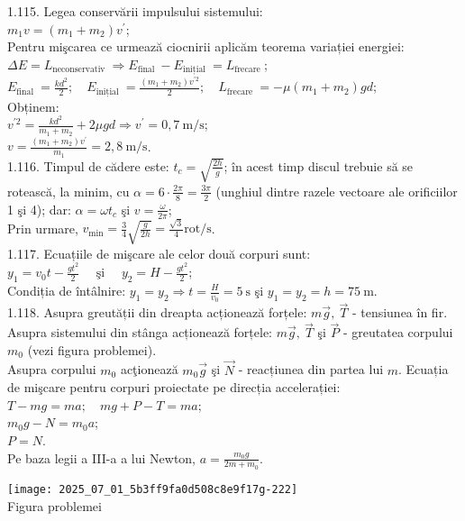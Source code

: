 1.115. Legea conservării impulsului sistemului:\\ $m_{1} v=\left(m_{1}+m_{2}\right) v^{\prime}$;\\ Pentru mişcarea ce urmează ciocnirii aplicăm teorema variației energiei:\\ $\Delta E=L_{\text {neconservativ }} \Rightarrow E_{\text {final }}-E_{\text {inițial }}=L_{\text {frecare }}$;\\ $E_{\text {final }}=\frac{k d^{2}}{2}; \quad E_{\text {inițial }}=\frac{\left(m_{1}+m_{2}\right) v^{\prime 2}}{2}; \quad L_{\text {frecare }}=-\mu\left(m_{1}+m_{2}\right) g d$;\\ Obținem:\\ $v^{\prime 2}=\frac{k d^{2}}{m_{1}+m_{2}}+2 \mu g d \Rightarrow v^{\prime}=0,7 \mathrm{~m} / \mathrm{s}$;\\ $v=\frac{\left(m_{1}+m_{2}\right) v^{\prime}}{m_{1}}=2,8 \mathrm{~m} / \mathrm{s}$.\\

1.116. Timpul de cădere este: $t_{c}=\sqrt{\frac{2 h}{g}}$; în acest timp discul trebuie să se rotească, la minim, cu $\alpha=6 \cdot \frac{2 \pi}{8}=\frac{3 \pi}{2}$ (unghiul dintre razele vectoare ale orificiilor 1 şi 4); dar: $\alpha=\omega t_{c}$ şi $v=\frac{\omega}{2 \pi}$;\\ Prin urmare, $v_{\min }=\frac{3}{4} \sqrt{\frac{g}{2 h}}=\frac{\sqrt{3}}{4} \mathrm{rot} / \mathrm{s}$.\\

1.117. Ecuațiile de mişcare ale celor două corpuri sunt:\\ $y_{1}=v_{0} t-\frac{g t^{2}}{2} \quad \text { şi } \quad y_{2}=H-\frac{g t^{2}}{2}$;\\ Condiția de întâlnire: $y_{1}=y_{2} \Rightarrow t=\frac{H}{v_{0}}=5 \mathrm{~s}$ şi $y_{1}=y_{2}=h=75 \mathrm{~m}$.\\

1.118. Asupra greutății din dreapta acționează forțele: $m \vec{g},\ \vec{T}$ - tensiunea în fir. Asupra sistemului din stânga acționează forțele: $m \vec{g},\ \vec{T}$ şi $\vec{P}$ - greutatea corpului $m_{0}$ (vezi figura problemei).\\ Asupra corpului $m_{0}$ acţionează $m_{0} \vec{g}$ şi $\vec{N}$ - reacțiunea din partea lui $m$. Ecuația de mişcare pentru corpuri proiectate pe direcția accelerației:\\ $T-m g=m a; \quad m g+P-T=m a$;\\ $m_{0} g-N=m_{0} a$;\\ $P=N$.\\ Pe baza legii a III-a a lui Newton, $a=\frac{m_{0} g}{2 m+m_{0}}$.\\ \begin{center} \texttt{[image: 2025\_07\_01\_5b3ff9fa0d508c8e9f17g-222]}\\ Figura problemei \end{center}\\

